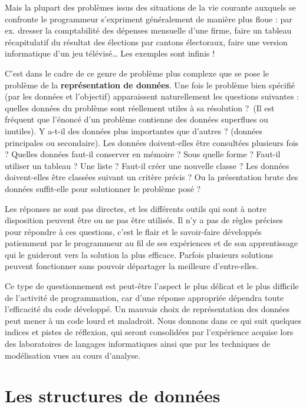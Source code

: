 Mais la plupart des problèmes issus des situations de la vie courante
auxquels se confronte le programmeur s’expriment généralement de
manière plus floue : par ex. dresser la comptabilité des dépenses
mensuelle d’une firme, faire un tableau récapitulatif du résultat des
élections par cantons électoraux, faire une version informatique d’un
jeu télévisé… Les exemples sont infinis !


C’est dans le cadre de ce genre de problème plus complexe que se pose le
problème de la \textbf{représentation de données}. Une fois le problème
bien spécifié (par les données et l’objectif) apparaissent
naturellement les questions suivantes : quelles données du problème
sont réellement utiles à sa résolution ?~(Il est fréquent que l’énoncé
d’un problème contienne des données superflues ou inutiles). Y a-t-il
des données plus importantes que d’autres ? (données principales ou
secondaire). Les données doivent-elles être consultées plusieurs fois ?
Quelles données faut-il conserver en mémoire ? Sous quelle forme ?
Faut-il utiliser un tableau ? Une liste ? Faut-il créer une nouvelle
classe ? Les données doivent-elles être classées suivant un critère
précis ? Ou la présentation brute des données suffit-elle pour
solutionner le problème posé ?

Les réponses ne sont pas directes, et les différents outils qui sont à
notre disposition peuvent être ou ne pas être utilisés. Il n’y a pas de
règles précises pour répondre à ces questions, c’est le flair et le
savoir-faire développés patiemment par le programmeur au fil de ses
expériences et de son apprentissage qui le guideront vers la solution
la plus efficace. Parfois plusieurs solutions peuvent fonctionner sans
pouvoir départager la meilleure d’entre-elles.

Ce type de questionnement est peut-être l’aspect le plus délicat et le
plus difficile de l’activité de programmation, car d’une réponse
appropriée dépendra toute l’efficacité du code développé. Un mauvais
choix de représentation des données peut mener à un code lourd et
maladroit. Nous donnons dans ce qui suit quelques indices et pistes de
réflexion, qui seront consolidées par l’expérience acquise lors des
laboratoires de langages informatiques ainsi que par les techniques de
modélisation vues au cours d’analyse.


\section{Les structures de données%
}

